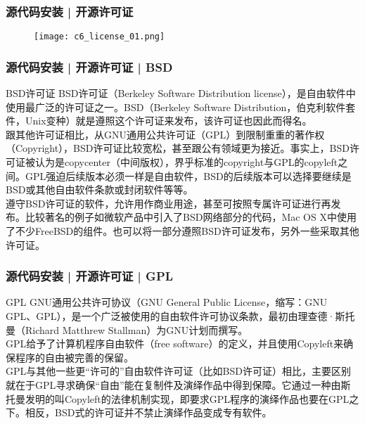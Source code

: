 \begin{frame}
  \frametitle{源代码安装 | 开源许可证}
  \begin{figure}
    \centering
    \texttt{[image: c6\_license\_01.png]}
  \end{figure}
\end{frame}

\begin{frame}
  \frametitle{源代码安装 | 开源许可证 | BSD}
  \begin{block}{BSD许可证}
    \alert{BSD}许可证（Berkeley Software Distribution license），是自由软件中使用最广泛的许可证之一。BSD（Berkeley Software Distribution，伯克利软件套件，Unix变种）就是遵照这个许可证来发布，该许可证也因此而得名。\\
    跟其他许可证相比，从GNU通用公共许可证（GPL）到限制重重的著作权（Copyright），BSD许可证比较宽松，甚至跟公有领域更为接近。事实上，BSD许可证被认为是copycenter（中间版权），界乎标准的copyright与GPL的copyleft之间。GPL强迫后续版本必须一样是自由软件，BSD的后续版本可以选择要继续是BSD或其他自由软件条款或封闭软件等等。\\
    遵守BSD许可证的软件，允许用作商业用途，甚至可按照专属许可证进行再发布。比较著名的例子如微软产品中引入了BSD网络部分的代码，Mac OS X中使用了不少FreeBSD的组件。也可以将一部分遵照BSD许可证发布，另外一些采取其他许可证。
  \end{block}
\end{frame}

\begin{frame}
  \frametitle{源代码安装 | 开源许可证 | GPL}
  \begin{block}{GPL}
    GNU通用公共许可协议（GNU General Public License，缩写：GNU GPL、GPL），是一个广泛被使用的自由软件许可协议条款，最初由理查德·斯托曼（Richard Matthrew Stallman）为GNU计划而撰写。\\
    \alert{GPL}给予了计算机程序自由软件（free software）的定义，并且使用Copyleft来确保程序的自由被完善的保留。\\
    GPL与其他一些更“许可的”自由软件许可证（比如BSD许可证）相比，主要区别就在于GPL寻求确保“自由”能在复制件及演绎作品中得到保障。它通过一种由斯托曼发明的叫Copyleft的法律机制实现，即要求GPL程序的演绎作品也要在GPL之下。相反，BSD式的许可证并不禁止演绎作品变成专有软件。
  \end{block}
\end{frame}


